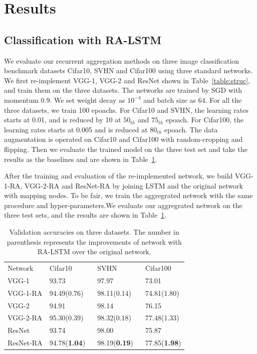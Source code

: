 \documentclass[runningheads]{llncs}
\begin{document}
\section{Results}

\subsection{Classification with RA-LSTM}

We evaluate our recurrent aggregation methods on three image classification benchmark datasets Cifar10, SVHN and Cifar100 using three standard networks. We first re-implement VGG-1, VGG-2 and ResNet shown in Table~\ref{table:struc}, and train them on the three datasets. The networks are trained by SGD with momentum 0.9. We set weight decay as $10^{-4}$ and batch size as 64. For all the three datasets, we train 100 epoachs. For Cifar10 and SVHN, the learning rates starts at 0.01, and is reduced by 10 at $50_{th}$ and $75_{th}$ epoach. For Cifar100, the learning rates starts at 0.005 and is reduced at $80_{th}$ epoach. The data augmentation is operated on Cifar10 and Cifar100 with random-cropping and flipping. Then we evaluate the trained model on the three test set and take the results as the baselines and are shown in Table~\ref{table:test}.

After the training and evaluation of the re-implemented network, we build VGG-1-RA, VGG-2-RA and ResNet-RA by joining LSTM and the original network with mapping nodes. To be fair, we train the aggregrated network with the same procedure and hyper-parameters.We evaluate our aggregrated network on the three test sets, and the results are shown in Table~\ref{table:test}.
\setlength{\tabcolsep}{4pt}
\begin{table}
\begin{center}
\caption{Validation accuracies on three datasets. The number in parenthesis represents the improvements of network with RA-LSTM over the original network.}
\label{table:test}
\begin{tabular}{l|lll}
\hline\noalign{\smallskip}
Network& Cifar10 & SVHN & Cifar100\\
\noalign{\smallskip}
\hline
\noalign{\smallskip}
VGG-1 & 93.73 & 97.97 & 73.01\\
VGG-1-RA & 94.49(0.76)$\quad$ & 98.11(0.14)$\quad$ & 74.81(1.80)\\
VGG-2 & 94.91 & 98.14 & 76.15\\
VGG-2-RA & 95.30(0.39) & 98.32(0.18) & 77.48(1.33)\\
ResNet & 93.74 & 98.00 & 75.87\\
ResNet-RA & 94.78(\textbf{1.04}) & 98.19(\textbf{0.19}) & 77.85(\textbf{1.98})\\
\hline
\end{tabular}
\end{center}
\end{table}
\setlength{\tabcolsep}{1.4pt}
\end{document}
